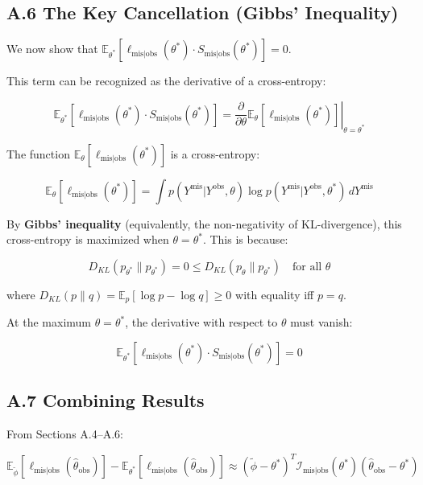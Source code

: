 \documentclass[
]{article}
\begin{document}
\subsection{A.6 The Key Cancellation (Gibbs'
Inequality)}\label{a.6-the-key-cancellation-gibbs-inequality}

We now show that
\(\mathbb{E}_{\theta^*}[\ell_{\text{mis}|\text{obs}}(\theta^*) \cdot S_{\text{mis}|\text{obs}}(\theta^*)] = 0\).

This term can be recognized as the derivative of a cross-entropy:

\[\mathbb{E}_{\theta^*}[\ell_{\text{mis}|\text{obs}}(\theta^*) \cdot S_{\text{mis}|\text{obs}}(\theta^*)] = \left.\frac{\partial}{\partial \theta}\mathbb{E}_{\theta}[\ell_{\text{mis}|\text{obs}}(\theta^*)]\right|_{\theta=\theta^*}\]

The function
\(\mathbb{E}_{\theta}[\ell_{\text{mis}|\text{obs}}(\theta^*)]\) is a
cross-entropy:

\[\mathbb{E}_{\theta}[\ell_{\text{mis}|\text{obs}}(\theta^*)] = \int p(Y^{\text{mis}}|Y^{\text{obs}},\theta) \log p(Y^{\text{mis}}|Y^{\text{obs}},\theta^*) \, dY^{\text{mis}}\]

By \textbf{Gibbs' inequality} (equivalently, the non-negativity of
KL-divergence), this cross-entropy is maximized when
\(\theta = \theta^*\). This is because:

\[D_{KL}(p_{\theta^*} \| p_{\theta^*}) = 0 \leq D_{KL}(p_\theta \| p_{\theta^*}) \quad \text{for all } \theta\]

where \(D_{KL}(p \| q) = \mathbb{E}_p[\log p - \log q] \geq 0\) with
equality iff \(p = q\).

At the maximum \(\theta = \theta^*\), the derivative with respect to
\(\theta\) must vanish:

\[\mathbb{E}_{\theta^*}[\ell_{\text{mis}|\text{obs}}(\theta^*) \cdot S_{\text{mis}|\text{obs}}(\theta^*)] = 0\]

\subsection{A.7 Combining Results}\label{a.7-combining-results}

From Sections A.4--A.6:

\[\mathbb{E}_{\tilde{\phi}}[\ell_{\text{mis}|\text{obs}}(\hat{\theta}_{\text{obs}})] - \mathbb{E}_{\theta^*}[\ell_{\text{mis}|\text{obs}}(\hat{\theta}_{\text{obs}})] \approx (\tilde{\phi} - \theta^*)^T \mathcal{I}_{\text{mis}|\text{obs}}(\theta^*)(\hat{\theta}_{\text{obs}} - \theta^*)\]
\end{document}
